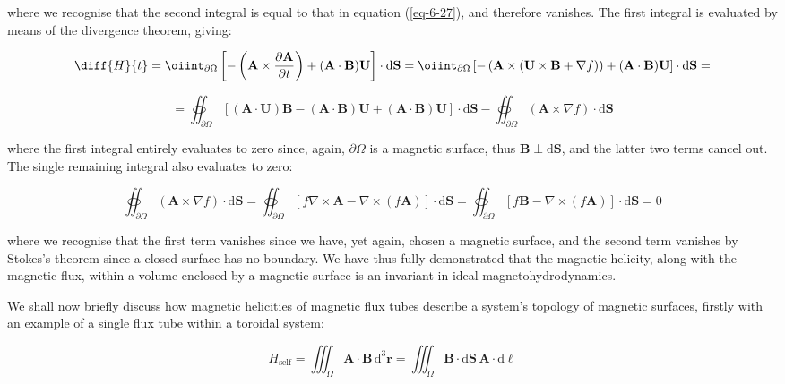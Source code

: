 where we recognise that the second integral is equal to that in equation (\ref{eq-6-27}), and therefore vanishes. The first integral is evaluated by means of the divergence theorem, giving: 

\begin{equation}
    \diff{H}{t}=\oiint_{\partial\Omega}\left[-\left(\mathbf{A}\times\frac{\partial\mathbf{A}}{\partial t}\right)+(\mathbf{A}\cdot\mathbf{B})\mathbf{U}\right]\cdot\mathrm{d}\mathbf{S}=\oiint_{\partial\Omega}\left[-\left(\mathbf{A}\times\left(\mathbf{U}\times\mathbf{B}+\nabla f\right)\right)+(\mathbf{A}\cdot\mathbf{B})\mathbf{U}\right]\cdot\mathrm{d}\mathbf{S}=
\end{equation}

\begin{equation}
    =\oiint_{\partial\Omega}\left[(\mathbf{A}\cdot\mathbf{U})\mathbf{B}-(\mathbf{A}\cdot\mathbf{B})\mathbf{U}+(\mathbf{A}\cdot\mathbf{B})\mathbf{U}\right]\cdot\mathrm{d}\mathbf{S}-\oiint_{\partial\Omega}\left(\mathbf{A}\times\nabla f\right)\cdot\mathrm{d}\mathbf{S}
\end{equation}

where the first integral entirely evaluates to zero since, again, $\partial\Omega$ is a magnetic surface, thus $\mathbf{B}\perp\mathrm{d}\mathbf{S}$, and the latter two terms cancel out. The single remaining integral also evaluates to zero:

\begin{equation}
    \oiint_{\partial\Omega}\left(\mathbf{A}\times\nabla f\right)\cdot\mathrm{d}\mathbf{S}=\oiint_{\partial\Omega}\left[f\nabla\times\mathbf{A}-\nabla\times(f\mathbf{A})\right]\cdot\mathrm{d}\mathbf{S}=\oiint_{\partial\Omega}\left[f\mathbf{B}-\nabla\times(f\mathbf{A})\right]\cdot\mathrm{d}\mathbf{S}=0
\end{equation}

where we recognise that the first term vanishes since we have, yet again, chosen a magnetic surface, and the second term vanishes by Stokes's theorem since a closed surface has no boundary. We have thus fully demonstrated that the magnetic helicity, along with the magnetic flux, within a volume enclosed by a magnetic surface is an invariant in ideal magnetohydrodynamics.

\quad We shall now briefly discuss how magnetic helicities of magnetic flux tubes describe a system's topology of magnetic surfaces, firstly with an example of a single flux tube within a toroidal system:

\begin{equation}
    H_\text{self}=\iiint_\Omega\mathbf{A}\cdot\mathbf{B}\,\mathrm{d}^3\mathbf{r}=\iiint_\Omega\mathbf{B}\cdot\mathrm{d}\mathbf{S}\,\mathbf{A}\cdot\mathrm{d}\boldsymbol{\ell}
\end{equation}


